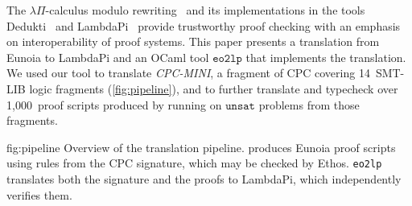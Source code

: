 \documentclass[class=llncs, crop=false]{standalone}
\begin{document}
The $\lambda\Pi$-calculus modulo rewriting~\cite{CousineauDowek}
and its implementations in the tools Dedukti~\cite{assaf2023dedukti}
and LambdaPi~\cite{hondet:hal-02981561} provide
trustworthy proof checking with an emphasis on
interoperability of proof systems.
%
This paper presents a translation from Eunoia to LambdaPi
and an OCaml tool $\texttt{eo2lp}$ that implements the
translation.
%
We used our tool to translate \emph{CPC-MINI}, a fragment
of CPC covering 14~SMT-LIB logic fragments
(\autoref{fig:pipeline}), and to further translate and
typecheck over 1{,}000~proof scripts produced by running
 on $\texttt{unsat}$ problems from those fragments.
\begin{boxfigure}[t!]{fig:pipeline}
	{{Overview of the translation pipeline.
				 produces Eunoia proof scripts using rules
				from the CPC signature, which may be checked by Ethos.
				\texttt{eo2lp} translates both the signature and the proofs
				to LambdaPi, which independently verifies them.}}
	\centering
\end{boxfigure}

\end{document}
